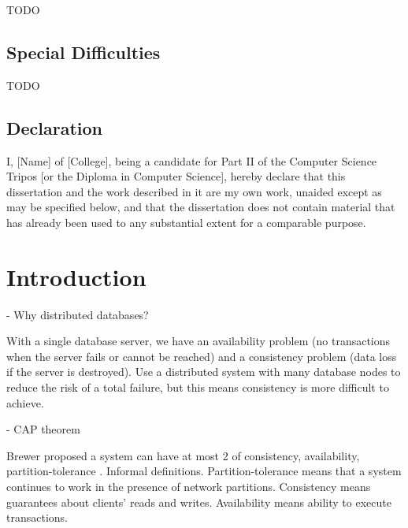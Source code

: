 \documentclass[12pt,a4paper,twoside,openright]{report}
\begin{document}
TODO

\section*{Special Difficulties}

TODO
 
\newpage
\section*{Declaration}

I, [Name] of [College], being a candidate for Part II of the Computer
Science Tripos [or the Diploma in Computer Science], hereby declare
that this dissertation and the work described in it are my own work,
unaided except as may be specified below, and that the dissertation
does not contain material that has already been used to any substantial
extent for a comparable purpose.

\bigskip
{}

\medskip
{}

\tableofcontents

\listoffigures


\pagestyle{headings}

\chapter{Introduction}


- Why distributed databases? \cite{bacon2003operating}

With a single database server, we have an availability problem (no transactions when the server fails or cannot be reached) and a consistency problem (data loss if the server is destroyed). Use a distributed system with many database nodes to reduce the risk of a total failure, but this means consistency is more difficult to achieve.

- CAP theorem \cite{brewer} \cite{gilbert}

Brewer proposed a system can have at most 2 of consistency, availability, partition-tolerance \cite{brewer}. Informal definitions. Partition-tolerance means that a system continues to work in the presence of network partitions. Consistency means guarantees about clients' reads and writes. Availability means ability to execute transactions.
\end{document}

